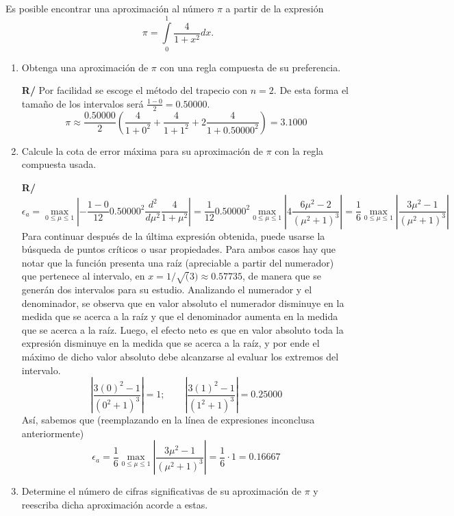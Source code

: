 \documentclass[12pt]{article}
\newcommand{\diff}[3]{\frac{d^{#3} #1}{d#2^{#3}}}
\begin{document}
  \begin{enumerate}[leftmargin=*,widest=9]
{\footnotesize
    \item Es posible encontrar una aproximación al número \(\pi \) a partir de la expresión
    \[ \pi = \int\limits_0^1 \frac{4}{1+x^2}dx.\]
    \begin{enumerate}[label=\alph*]
    \item Obtenga una aproximación de \(\pi \) con una regla compuesta de su preferencia.

    \textbf{R/} Por facilidad se escoge el método del trapecio con \(n=2\). De esta forma el tamaño de los intervalos será \( \frac{1-0}{2} = 0.50000\).
    \[ \pi \approx \frac{0.50000}{2}\left(\frac{4}{1+0^2} + \frac{4}{1+1^2} + 2\frac{4}{1+0.50000^2}\right) = 3.1000 \]
    \item Calcule la cota de error máxima para su aproximación de \(\pi \) con la regla compuesta usada.

\textbf{R/}
\[
\epsilon_a = \max\limits_{0 \leq \mu \leq 1} \left\vert -\frac{1-0}{12}0.50000^2\diff{}{\mu}{2}\frac{4}{1+\mu^2} \right\vert = \frac{1}{12}0.50000^2 \max\limits_{0 \leq \mu \leq 1} \left\vert 4\frac{6\mu^2-2}{{(\mu^2+1)}^3} \right\vert = \frac{1}{6} \max\limits_{0 \leq \mu \leq 1} \left\vert \frac{3\mu^2-1}{{(\mu^2+1)}^3} \right\vert
\]
Para continuar después de la última expresión obtenida, puede usarse la búsqueda de puntos críticos o usar propiedades.
Para ambos casos hay que notar que la función presenta una raíz (apreciable a partir del numerador) que pertenece al intervalo, en \(x = 1/\sqrt(3) \approx 0.57735\), de manera que se generán dos intervalos para su estudio.
Analizando el numerador y el denominador, se observa que en valor absoluto el numerador disminuye en la medida que se acerca a la raíz y que el denominador aumenta en la medida que se acerca a la raíz. Luego, el efecto neto es que en valor absoluto toda la expresión disminuye en la medida que se acerca a la raíz, y por ende el máximo de dicho valor absoluto debe alcanzarse al evaluar los extremos del intervalo.
\[
\left\vert \frac{3{(0)}^2-1}{{(0^2+1)}^3} \right\vert = 1; \qquad \left\vert \frac{3{(1)}^2-1}{{(1^2+1)}^3} \right\vert = 0.25000
\]
Así, sabemos que (reemplazando en la línea de expresiones inconclusa anteriormente)
\[
\epsilon_a = \frac{1}{6} \max\limits_{0 \leq \mu \leq 1} \left\vert \frac{3\mu^2-1}{{(\mu^2+1)}^3} \right\vert = \frac{1}{6}\cdot 1 = 0.16667
\]
    \item Determine el número de cifras significativas de su aproximación de \(\pi \) y reescriba dicha aproximación acorde a estas.


\end{enumerate}}
\end{enumerate}
\end{document}
